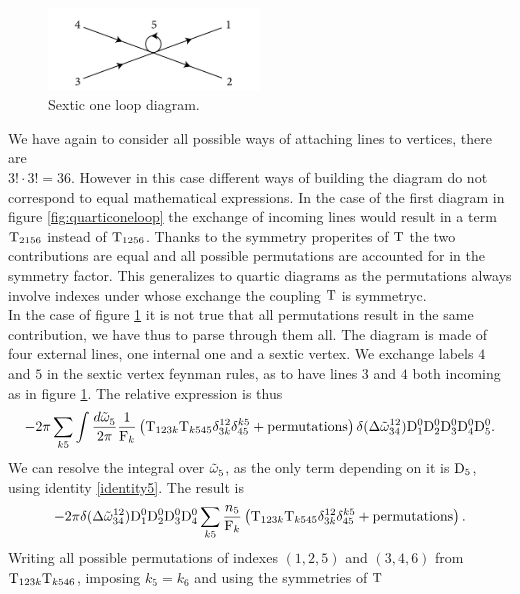 \begin{figure}[ht]
    \centering
    \includegraphics[width=0.5\textwidth]{images/sexticdiagram.jpg}
    \caption{Sextic one loop diagram.}
    \label{fig:sexticoneloop}
\end{figure}
We have again to consider all possible ways of attaching lines to vertices, there are \\$3!\cdot3! = 36$. However in this case different ways of building the diagram do not correspond to 
equal mathematical expressions. In the case of the first diagram in figure \ref{fig:quarticoneloop} the exchange of incoming lines would result in a term $\mathrm{T}_{2156}$
instead of $\mathrm{T}_{1256}$. Thanks to the symmetry properites of $\mathrm{T}$ the two contributions are equal and all possible permutations are accounted for in the symmetry factor.
This generalizes to quartic diagrams as the permutations always involve indexes under whose exchange the coupling $\mathrm{T}$ is symmetryc.\\ 
In the case of figure \ref{fig:sexticoneloop} it is not true that all permutations result in the same contribution, we have thus to parse through them all. The diagram 
is made of four external lines, one internal one and a sextic vertex. We exchange labels $4$ and $5$ in the sextic vertex feynman rules, as to have lines $3$ and 
$4$ both incoming as in figure \ref{fig:sexticoneloop}. The relative expression is thus  
\begin{equation}
    -2\pi \sum_{k5}\int\frac{d\tilde{\omega}^{}_5}{2\pi} \frac{1}{\mathrm{F}_k}\left(\mathrm{T}_{123k}\mathrm{T}_{k545}\delta^{12}_{3k}
    \delta^{k5}_{45} + \text{permutations}\right)\delta(\Delta{\tilde{\omega}}^{12}_{34})
    \mathrm{D}_1^0\mathrm{D}_2^0\mathrm{D}_3^0\mathrm{D}_4^0\mathrm{D}_5^0.
\end{equation}
We can resolve the integral over $\tilde{\omega}^{}_5$, as the only term depending on it is $\mathrm{D}_5$, using identity \eqref{identity5}. The result is
\begin{equation}
    -2\pi \delta(\Delta{\tilde{\omega}}^{12}_{34})\mathrm{D}_1^0\mathrm{D}_2^0\mathrm{D}_3^0\mathrm{D}_4^0 \sum_{k5}
    \frac{n_5}{\mathrm{F}_k}\left(\mathrm{T}_{123k}\mathrm{T}_{k545}\delta^{12}_{3k}
    \delta^{k5}_{45} + \text{permutations}\right).
\end{equation}
Writing all possible permutations of indexes $(1,2,5)$ and $(3,4,6)$ from $\mathrm{T}_{123k}\mathrm{T}_{k546}$, imposing $k_5 = k_6$ and using the symmetries of $\mathrm{T}$ 
